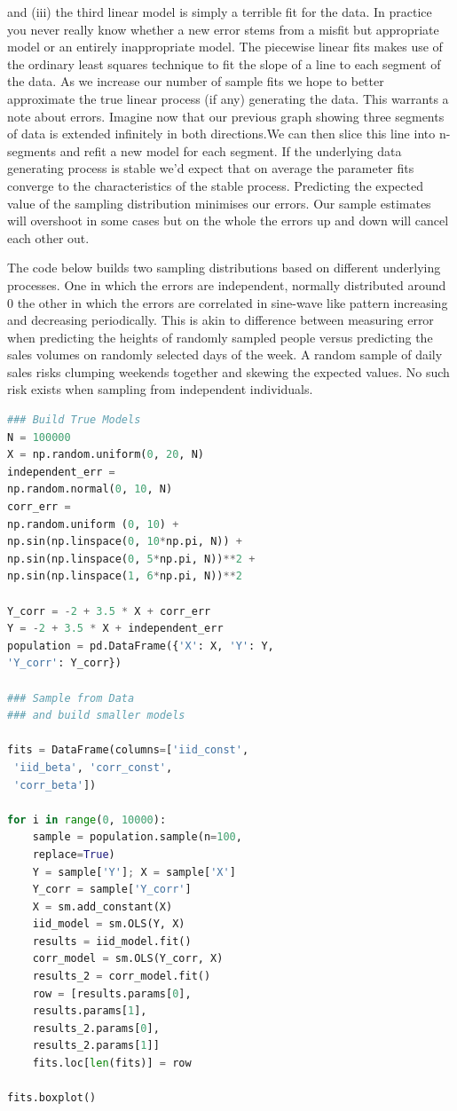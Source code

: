 \documentclass[10pt,a4paper,notitlepage, twocolumn]{article}
\begin{document}
and (iii) the third linear model is simply a terrible fit for the data. In practice you never really know whether a new error stems from a misfit but appropriate model or an entirely inappropriate model. The piecewise linear fits makes use of the ordinary least squares technique to fit the slope of a line to each segment of the data. As we increase our number of sample fits we hope to better approximate the true linear process (if any) generating the data. This warrants a note about errors. Imagine now that our previous graph showing three segments of data is extended infinitely in both directions.We can then slice this line into n-segments and refit a new model for each segment. If the underlying data generating process is stable we'd expect that on average the parameter fits converge to the characteristics of the stable process. Predicting the expected value of the sampling distribution minimises our errors. Our sample estimates will overshoot in some cases but on the whole the errors up and down will cancel each other out.

The code below builds two sampling distributions based on different underlying processes.  One in which the errors are independent, normally distributed around 0 the other in which the errors are correlated in sine-wave like pattern increasing and decreasing periodically. This is akin to difference between measuring error when predicting the heights of randomly sampled people versus predicting the sales volumes on randomly selected days of the week. A random sample of daily sales  risks clumping weekends together and skewing the expected values. No such risk exists when sampling from independent individuals. 

\begin{lstlisting}[language=Python]
### Build True Models
N = 100000
X = np.random.uniform(0, 20, N)
independent_err = 
np.random.normal(0, 10, N)
corr_err = 
np.random.uniform (0, 10) + 
np.sin(np.linspace(0, 10*np.pi, N)) + 
np.sin(np.linspace(0, 5*np.pi, N))**2 + 
np.sin(np.linspace(1, 6*np.pi, N))**2

Y_corr = -2 + 3.5 * X + corr_err
Y = -2 + 3.5 * X + independent_err
population = pd.DataFrame({'X': X, 'Y': Y, 
'Y_corr': Y_corr})

### Sample from Data 
### and build smaller models

fits = DataFrame(columns=['iid_const',
 'iid_beta', 'corr_const', 
 'corr_beta'])
 
for i in range(0, 10000):
    sample = population.sample(n=100, 
    replace=True)
    Y = sample['Y']; X = sample['X']
    Y_corr = sample['Y_corr']
    X = sm.add_constant(X)
    iid_model = sm.OLS(Y, X)
    results = iid_model.fit()
    corr_model = sm.OLS(Y_corr, X)
    results_2 = corr_model.fit()
    row = [results.params[0], 
    results.params[1],
    results_2.params[0], 
    results_2.params[1]]
    fits.loc[len(fits)] = row
    
fits.boxplot()
\end{lstlisting}
\end{document}
